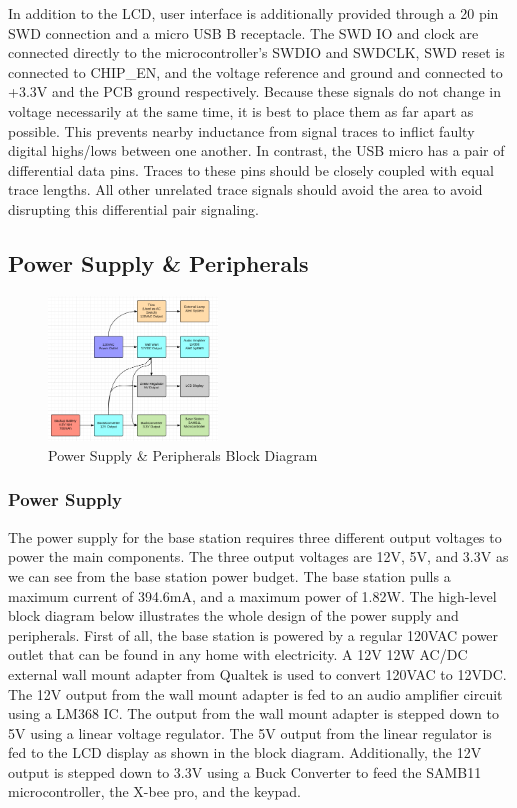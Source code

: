 \documentclass[journal,compsoc]{IEEEtran}
\begin{document}
In addition to the LCD, user interface is additionally provided through a 20 pin SWD connection and a micro USB B receptacle. The SWD IO and clock are connected directly to the microcontroller's SWDIO and SWDCLK, SWD reset is connected to CHIP\_EN, and the voltage reference and ground and connected to +3.3V and the PCB ground respectively. Because these signals do not change in voltage necessarily at the same time, it is best to place them as far apart as possible. This prevents nearby inductance from signal traces to inflict faulty digital highs/lows between one another. In contrast, the USB micro has a pair of differential data pins. Traces to these pins should be closely coupled with equal trace lengths. All other unrelated trace signals should avoid the area to avoid disrupting this differential pair signaling.

\subsection {Power Supply \& Peripherals}

\begin{figure}[ht] 	%
\centering
\includegraphics[width=0.4\textwidth]{BlockDiagram.png}
\caption{ \space Power Supply \& Peripherals Block Diagram}
\label{Psupply}
\end{figure}

\subsubsection{Power Supply}

The power supply for the base station requires three different output voltages to power the main components. The three output voltages are 12V, 5V, and 3.3V as we can see from the base station power budget. The base station pulls a maximum current of 394.6mA, and a maximum power of 1.82W. The high-level block diagram below illustrates the whole design of the power supply and peripherals. First of all, the base station is powered by a regular 120VAC power outlet that can be found in any home with electricity. A 12V 12W AC/DC external wall mount adapter from Qualtek is used to convert 120VAC to 12VDC. The 12V output from the wall mount adapter is fed to an audio amplifier circuit using a LM368 IC. The output from the wall mount adapter is stepped down to 5V using a linear voltage regulator. The 5V output from the linear regulator is fed to the LCD display as shown in the block diagram. Additionally, the 12V output is stepped down to 3.3V using a Buck Converter to feed the SAMB11 microcontroller, the X-bee pro, and the keypad. 
\end{document}
